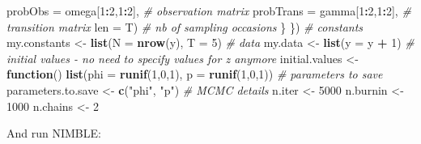 \documentclass[
  12pt,
]{krantz}
\newenvironment{Shaded}{\begin{snugshade}}{\end{snugshade}}
\newcommand{\AttributeTok}[1]{\textcolor[rgb]{0.13,0.29,0.53}{#1}}
\newcommand{\CommentTok}[1]{\textcolor[rgb]{0.56,0.35,0.01}{\textit{#1}}}
\newcommand{\ControlFlowTok}[1]{\textcolor[rgb]{0.13,0.29,0.53}{\textbf{#1}}}
\newcommand{\DecValTok}[1]{\textcolor[rgb]{0.00,0.00,0.81}{#1}}
\newcommand{\FunctionTok}[1]{\textcolor[rgb]{0.13,0.29,0.53}{\textbf{#1}}}
\newcommand{\NormalTok}[1]{#1}
\newcommand{\OtherTok}[1]{\textcolor[rgb]{0.56,0.35,0.01}{#1}}
\newcommand{\SpecialCharTok}[1]{\textcolor[rgb]{0.81,0.36,0.00}{\textbf{#1}}}
\newcommand{\StringTok}[1]{\textcolor[rgb]{0.31,0.60,0.02}{#1}}
\begin{document}
\begin{Shaded}
\begin{Highlighting}[]
                    \AttributeTok{probObs =}\NormalTok{ omega[}\DecValTok{1}\SpecialCharTok{:}\DecValTok{2}\NormalTok{,}\DecValTok{1}\SpecialCharTok{:}\DecValTok{2}\NormalTok{], }\CommentTok{\# observation matrix}
                    \AttributeTok{probTrans =}\NormalTok{ gamma[}\DecValTok{1}\SpecialCharTok{:}\DecValTok{2}\NormalTok{,}\DecValTok{1}\SpecialCharTok{:}\DecValTok{2}\NormalTok{], }\CommentTok{\# transition matrix}
                    \AttributeTok{len =}\NormalTok{ T) }\CommentTok{\# nb of sampling occasions}
\NormalTok{  \}}
\NormalTok{\})}
\CommentTok{\# constants}
\NormalTok{my.constants }\OtherTok{\textless{}{-}} \FunctionTok{list}\NormalTok{(}\AttributeTok{N =} \FunctionTok{nrow}\NormalTok{(y), }\AttributeTok{T =} \DecValTok{5}\NormalTok{)}
\CommentTok{\# data}
\NormalTok{my.data }\OtherTok{\textless{}{-}} \FunctionTok{list}\NormalTok{(}\AttributeTok{y =}\NormalTok{ y }\SpecialCharTok{+} \DecValTok{1}\NormalTok{)}
\CommentTok{\# initial values {-} no need to specify values for z anymore}
\NormalTok{initial.values }\OtherTok{\textless{}{-}} \ControlFlowTok{function}\NormalTok{() }\FunctionTok{list}\NormalTok{(}\AttributeTok{phi =} \FunctionTok{runif}\NormalTok{(}\DecValTok{1}\NormalTok{,}\DecValTok{0}\NormalTok{,}\DecValTok{1}\NormalTok{),}
                                  \AttributeTok{p =} \FunctionTok{runif}\NormalTok{(}\DecValTok{1}\NormalTok{,}\DecValTok{0}\NormalTok{,}\DecValTok{1}\NormalTok{))}
\CommentTok{\# parameters to save}
\NormalTok{parameters.to.save }\OtherTok{\textless{}{-}} \FunctionTok{c}\NormalTok{(}\StringTok{"phi"}\NormalTok{, }\StringTok{"p"}\NormalTok{)}
\CommentTok{\# MCMC details}
\NormalTok{n.iter }\OtherTok{\textless{}{-}} \DecValTok{5000}
\NormalTok{n.burnin }\OtherTok{\textless{}{-}} \DecValTok{1000}
\NormalTok{n.chains }\OtherTok{\textless{}{-}} \DecValTok{2}
\end{Highlighting}
\end{Shaded}

And run NIMBLE:
\end{document}
